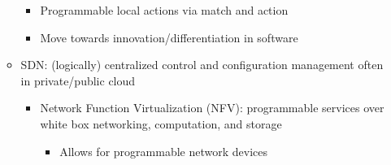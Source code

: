 \begin{itemize}
\begin{itemize}
\begin{itemize}
          \item Programmable local actions via match and action

          \item Move towards innovation/differentiation in software

        \end{itemize}

      \item SDN: (logically) centralized control and configuration management often in private/public cloud

        \begin{itemize}

          \item Network Function Virtualization (NFV): programmable services over white box networking, computation, and storage

            \begin{itemize}

              \item Allows for programmable network devices

            \end{itemize}

        \end{itemize}

    \end{itemize}

\end{itemize}



